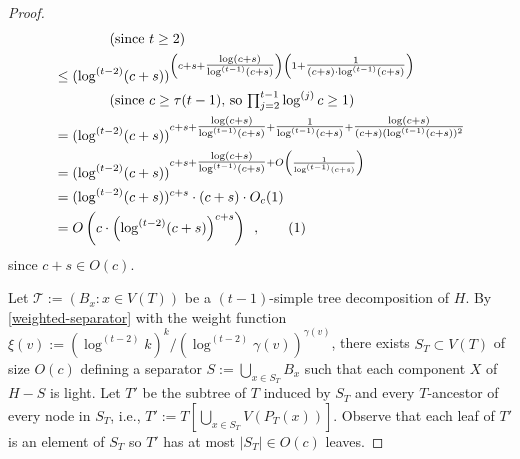 \documentclass[kpfonts]{patmorin}
\newcommand\numberthis{\addtocounter{equation}{1}\tag{\theequation}}
\theoremstyle{named}
\begin{document}
\begin{proof}
\begin{align*}
            & \qquad\qquad\text{(since $t\ge 2$)}\\
        & \le (\log^{(t-2)}(c+s))^{\left(c+s+\tfrac{\log(c+s)}{\log^{(t-1)}(c+s)}\right)
            \left(1 + \tfrac{1}{(c+s)\cdot \log^{(t-1)}(c+s)}\right)} \\
            & \qquad\qquad\text{(since $c\ge \tau(t-1)$, so $\textstyle \prod_{j=2}^{t-1}\log^{(j)}c\ge 1$)} \\
        & = (\log^{(t-2)}(c+s))^{c+s+\tfrac{\log(c+s)}{\log^{(t-1)}(c+s)} +
            \tfrac{1}{\log^{(t-1)}(c+s)} + \tfrac{\log(c+s)}{(c+s)(\log^{(t-1)}(c+s))^2}}  \\
        & = (\log^{(t-2)}(c+s))^{c+s+\tfrac{\log(c+s)}{\log^{(t-1)}(c+s)} + O\left(\frac{1}{\log^{(t-1)}(c+s)}\right)}  \\
        & = (\log^{(t-2)}(c+s))^{c+s}\cdot (c+s)\cdot O_c(1) \\
        & = O\left(c\cdot\left(\log^{(t-2)}(c+s)\right)^{c+s}\right) \enspace ,
        \numberthis \label{sizer}
    \end{align*}
    since $c+s\in O(c)$.

    Let $\mathcal{T}:=(B_x:x\in V(T))$ be a $(t-1)$-simple tree decomposition of $H$.  By \cref{weighted-separator} with the weight function $\xi(v):=(\log^{(t-2)} k)^k/(\log^{(t-2)} \gamma(v))^{\gamma(v)}$, there exists $S_T\subset V(T)$ of size $O(c)$ defining a separator $S:=\bigcup_{x\in S_T} B_x$ such that each component $X$ of $H-S$ is light.  Let $T'$ be the subtree of $T$ induced by $S_T$ and every $T$-ancestor of every node in $S_T$, i.e., $T':=T[\bigcup_{x\in S_T} V(P_T(x))]$.
    Observe that each leaf of $T'$ is an element of $S_T$ so $T'$ has at most $|S_T|\in O(c)$ leaves.


\end{proof}
\end{document}
